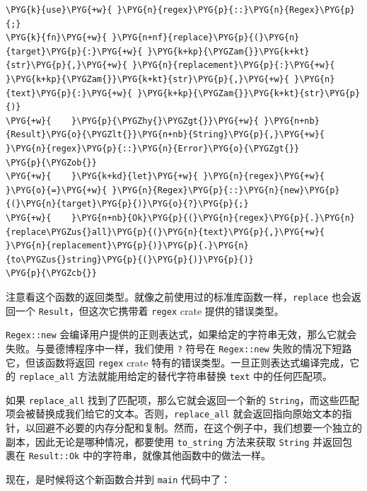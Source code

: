 \begin{Verbatim}[commandchars=\\\{\},breaklines=true,breakanywhere=true,fontsize=\codefont,xleftmargin=17bp]
\PYG{k}{use}\PYG{+w}{ }\PYG{n}{regex}\PYG{p}{::}\PYG{n}{Regex}\PYG{p}{;}
\PYG{k}{fn}\PYG{+w}{ }\PYG{n+nf}{replace}\PYG{p}{(}\PYG{n}{target}\PYG{p}{:}\PYG{+w}{ }\PYG{k+kp}{\PYGZam{}}\PYG{k+kt}{str}\PYG{p}{,}\PYG{+w}{ }\PYG{n}{replacement}\PYG{p}{:}\PYG{+w}{ }\PYG{k+kp}{\PYGZam{}}\PYG{k+kt}{str}\PYG{p}{,}\PYG{+w}{ }\PYG{n}{text}\PYG{p}{:}\PYG{+w}{ }\PYG{k+kp}{\PYGZam{}}\PYG{k+kt}{str}\PYG{p}{)}
\PYG{+w}{    }\PYG{p}{\PYGZhy{}\PYGZgt{}}\PYG{+w}{ }\PYG{n+nb}{Result}\PYG{o}{\PYGZlt{}}\PYG{n+nb}{String}\PYG{p}{,}\PYG{+w}{ }\PYG{n}{regex}\PYG{p}{::}\PYG{n}{Error}\PYG{o}{\PYGZgt{}}
\PYG{p}{\PYGZob{}}
\PYG{+w}{    }\PYG{k+kd}{let}\PYG{+w}{ }\PYG{n}{regex}\PYG{+w}{ }\PYG{o}{=}\PYG{+w}{ }\PYG{n}{Regex}\PYG{p}{::}\PYG{n}{new}\PYG{p}{(}\PYG{n}{target}\PYG{p}{)}\PYG{o}{?}\PYG{p}{;}
\PYG{+w}{    }\PYG{n+nb}{Ok}\PYG{p}{(}\PYG{n}{regex}\PYG{p}{.}\PYG{n}{replace\PYGZus{}all}\PYG{p}{(}\PYG{n}{text}\PYG{p}{,}\PYG{+w}{ }\PYG{n}{replacement}\PYG{p}{)}\PYG{p}{.}\PYG{n}{to\PYGZus{}string}\PYG{p}{(}\PYG{p}{)}\PYG{p}{)}
\PYG{p}{\PYGZcb{}}
\end{Verbatim}

注意看这个函数的返回类型。就像之前使用过的标准库函数一样，\texttt{replace} 也会返回一个 \texttt{Result}，但这次它携带着 \texttt{regex} crate 提供的错误类型。

\texttt{Regex::new} 会编译用户提供的正则表达式，如果给定的字符串无效，那么它就会失败。与曼德博程序中一样，我们使用 \texttt{?} 符号在 \texttt{Regex::new} 失败的情况下短路它，但该函数将返回 \texttt{regex} crate 特有的错误类型。一旦正则表达式编译完成，它的 \texttt{replace\_all} 方法就能用给定的替代字符串替换 \texttt{text} 中的任何匹配项。

如果 \texttt{replace\_all} 找到了匹配项，那么它就会返回一个新的 \texttt{String}，而这些匹配项会被替换成我们给它的文本。否则，\texttt{replace\_all} 就会返回指向原始文本的指针，以回避不必要的内存分配和复制。然而，在这个例子中，我们想要一个独立的副本，因此无论是哪种情况，都要使用 \texttt{to\_string} 方法来获取 \texttt{String} 并返回包裹在 \texttt{Result::Ok} 中的字符串，就像其他函数中的做法一样。

现在，是时候将这个新函数合并到 \texttt{main} 代码中了：

